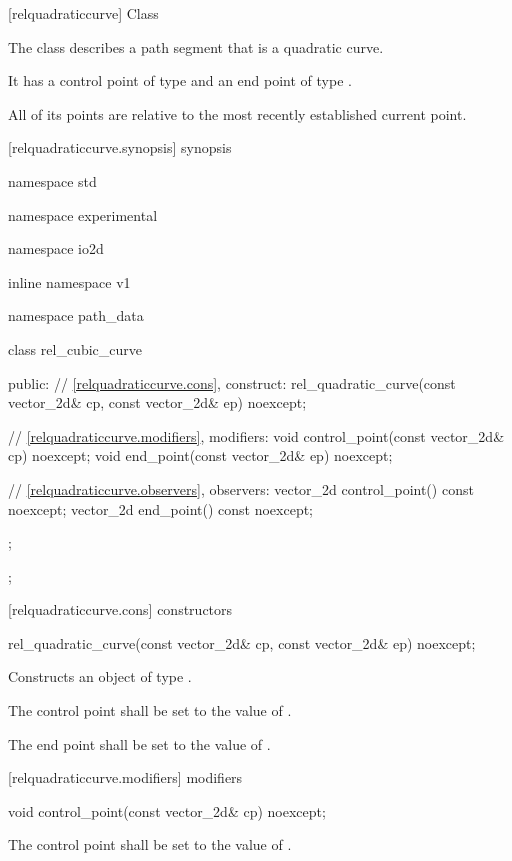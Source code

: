  [relquadraticcurve] {Class }

\pnum
{}
The class  describes a path segment that is a quadratic \bezierlocal curve.

\pnum
It has a control point of type  and an end point of type .

\pnum
All of its points are relative to the most recently established current point.

 [relquadraticcurve.synopsis] { synopsis}

\begin{codeblock}
namespace std { namespace experimental { namespace io2d { inline namespace v1 {
  namespace path_data {
    class rel_cubic_curve {
    public:
      // \ref{relquadraticcurve.cons}, construct:
      rel_quadratic_curve(const vector_2d& cp, const vector_2d& ep) noexcept;

      // \ref{relquadraticcurve.modifiers}, modifiers:
      void control_point(const vector_2d& cp) noexcept;
      void end_point(const vector_2d& ep) noexcept;

      // \ref{relquadraticcurve.observers}, observers:
      vector_2d control_point() const noexcept;
      vector_2d end_point() const noexcept;
    };
  };
} } } }
\end{codeblock}

 [relquadraticcurve.cons] { constructors}

\begin{itemdecl}
    rel_quadratic_curve(const vector_2d& cp, const vector_2d& ep) noexcept;
\end{itemdecl}
\begin{itemdescr}
	\pnum
	\effects
	Constructs an object of type .
	
	\pnum
	The control point shall be set to the value of .
	
	\pnum
	The end point shall be set to the value of .
\end{itemdescr}

 [relquadraticcurve.modifiers]{ modifiers}

\begin{itemdecl}
    void control_point(const vector_2d& cp) noexcept;
\end{itemdecl}
\begin{itemdescr}
	\pnum
	\effects
	The control point shall be set to the value of .
\end{itemdescr}

